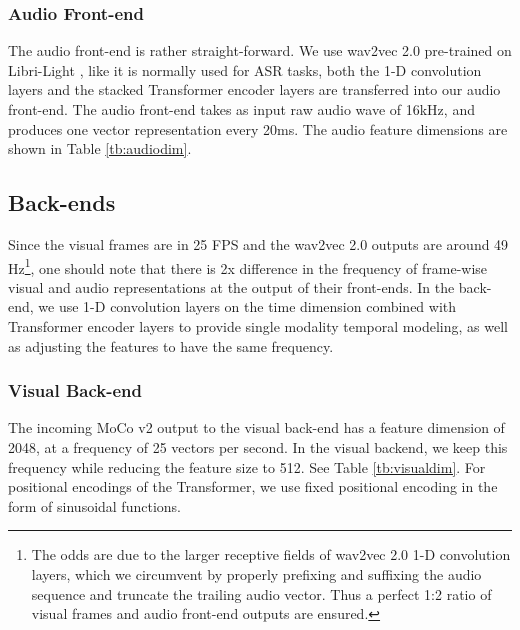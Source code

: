 \documentclass[letterpaper]{article} \usepackage{aaai22}  \usepackage{times}  \usepackage{helvet}  \usepackage{courier}  \usepackage[hyphens]{url}  \usepackage{graphicx} \urlstyle{rm} \def\UrlFont{\rm}  \usepackage{natbib}  \usepackage{caption} \usepackage{amsmath, xparse}
\begin{document}
\subsubsection{Audio Front-end}
The audio front-end is rather straight-forward. We use wav2vec 2.0 \cite{wav2vec} pre-trained on Libri-Light \cite{librilight}, like it is normally used for ASR tasks, both the 1-D convolution layers and the stacked Transformer encoder layers are transferred into our audio front-end. The audio front-end takes as input raw audio wave of 16kHz, and produces one vector representation every 20ms. The audio feature dimensions are shown in Table \ref{tb:audiodim}.

\subsection{Back-ends}
Since the visual frames are in 25 FPS and the wav2vec 2.0 outputs are around 49 Hz\footnote{The odds are due to the larger receptive fields of wav2vec 2.0 1-D convolution layers, which we circumvent by properly prefixing and suffixing the audio sequence and truncate the trailing audio vector. Thus a perfect 1:2 ratio of visual frames and audio front-end outputs are ensured. }, one should note that there is 2x difference in the frequency of frame-wise visual and audio representations at the output of their front-ends. In the back-end, we use 1-D convolution layers on the time dimension combined with Transformer encoder layers to provide single modality temporal modeling, as well as adjusting the features to have the same frequency. 


\subsubsection{Visual Back-end}
The incoming MoCo v2 output to the visual back-end has a feature dimension of 2048, at a frequency of 25 vectors per second. In the visual backend, we keep this frequency while reducing the feature size to 512. See Table \ref{tb:visualdim}. For positional encodings of the Transformer, we use fixed positional encoding in the form of sinusoidal functions. 
\end{document}
